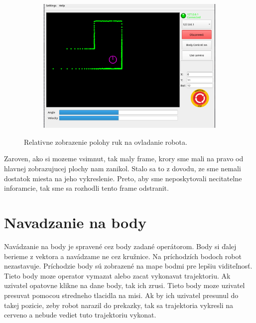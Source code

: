 \begin{figure}[!htbp]
	\vspace{\baselineskip}

	\begin{subfigure}{0.49\textwidth}
		\includegraphics[width=\textwidth]{img/body-control.png}
	\end{subfigure}

	\caption{ Relativne zobrazenie polohy ruk na ovladanie robota. }
	\label{fig:progres-bars}
\end{figure}

Zaroven, ako si mozeme vsimnut, tak maly frame, krory sme mali na pravo od hlavnej zobrazujucej plochy nam zanikol.
Stalo sa to z dovodu, ze sme nemali dostatok miesta na jeho vykreslenie. Preto, aby sme neposkytovali necitatelne
inforamcie, tak sme sa rozhodli tento frame odstranit.

\newpage

\section{Navadzanie na body}

Navádzanie na body je spravené cez body zadané operátorom. Body si ďalej berieme
z vektora a navádzame ne cez kružnice. Na príchodzích bodoch robot nezastavuje.
Príchodzie body sú zobrazené na mape bodmi pre lepšiu viditeľnosť. Tieto body moze operator vymazat alebo zacat
vykonavat trajektoriu. Ak uzivatel opatovne klikne na dane body, tak ich zrusi. Tieto body moze uzivatel presuvat
pomocou stredneho tlacidla na misi. Ak by ich uzivatel presunul do takej pozicie, zeby robot narazil do prekazky, tak sa
trajektoria vykresli na cerveno a nebude vediet tuto trajektoriu vykonat.

